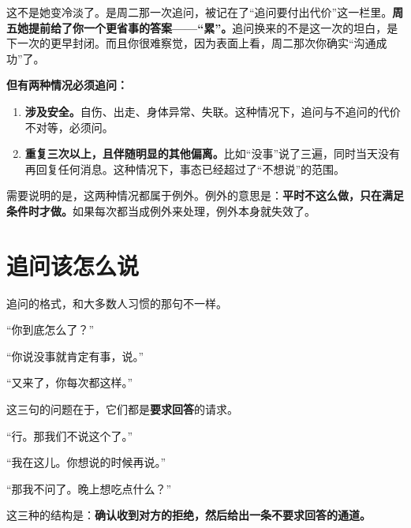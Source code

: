 这不是她变冷淡了。是周二那一次追问，被记在了“追问要付出代价”这一栏里。\textbf{周五她提前给了你一个更省事的答案——“累”。}追问换来的不是这一次的坦白，是下一次的更早封闭。而且你很难察觉，因为表面上看，周二那次你确实“沟通成功”了。

\textbf{但有两种情况必须追问：}

\begin{enumerate}[label=\bfseries\arabic*., leftmargin=2.4em, labelsep=0.7em,
                  itemsep=0.45em, topsep=0.2em, parsep=0.2em]
\item \textbf{涉及安全。}自伤、出走、身体异常、失联。这种情况下，追问与不追问的代价不对等，必须问。
\item \textbf{重复三次以上，且伴随明显的其他偏离。}比如“没事”说了三遍，同时当天没有再回复任何消息。这种情况下，事态已经超过了“不想说”的范围。
\end{enumerate}

需要说明的是，这两种情况都属于例外。例外的意思是：\textbf{平时不这么做，只在满足条件时才做。}如果每次都当成例外来处理，例外本身就失效了。

\section{追问该怎么说}

追问的格式，和大多数人习惯的那句不一样。

\begin{mdquote}
“你到底怎么了？”\par
\vspace{0.3\baselineskip}
“你说没事就肯定有事，说。”\par
\vspace{0.3\baselineskip}
“又来了，你每次都这样。”
\end{mdquote}

这三句的问题在于，它们都是\textbf{要求回答}的请求。

\begin{mdquote}
“行。那我们不说这个了。”\par
\vspace{0.3\baselineskip}
“我在这儿。你想说的时候再说。”\par
\vspace{0.3\baselineskip}
“那我不问了。晚上想吃点什么？”
\end{mdquote}

这三种的结构是：\textbf{确认收到对方的拒绝，然后给出一条不要求回答的通道。}

